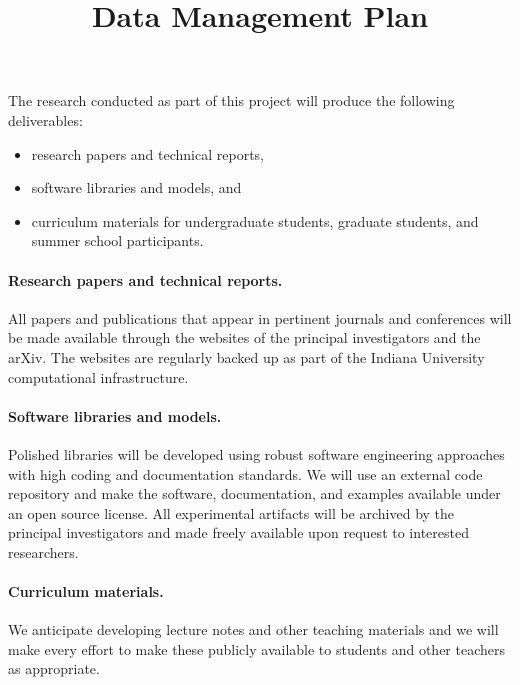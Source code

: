 \documentclass[11pt]{article}
\begin{document}
\title{Data Management Plan}
\author{}
\date{}
\maketitle


The research conducted as part of this project will produce the following
deliverables:
\begin{itemize}
\item research papers and technical reports,
\item software libraries and models, and
\item curriculum materials for undergraduate students, graduate students, and
summer school participants.
\end{itemize}

\paragraph*{Research papers and technical reports.}
All papers and publications that appear in pertinent journals and
conferences will be made available through the websites of the principal
investigators and the arXiv. The websites are regularly backed up as part of
the Indiana University computational infrastructure.  

\paragraph*{Software libraries and models.}
Polished libraries will be developed using robust software engineering
approaches with high coding and documentation standards. We will use an
external code repository and make the software, documentation, and examples
available under an open source license. All experimental artifacts will be
archived by the principal investigators and made freely available upon
request to interested researchers.  

\paragraph*{Curriculum materials.}
We anticipate developing lecture notes and other teaching materials and we
will make every effort to make these publicly available to students and other
teachers as appropriate.
\end{document}
